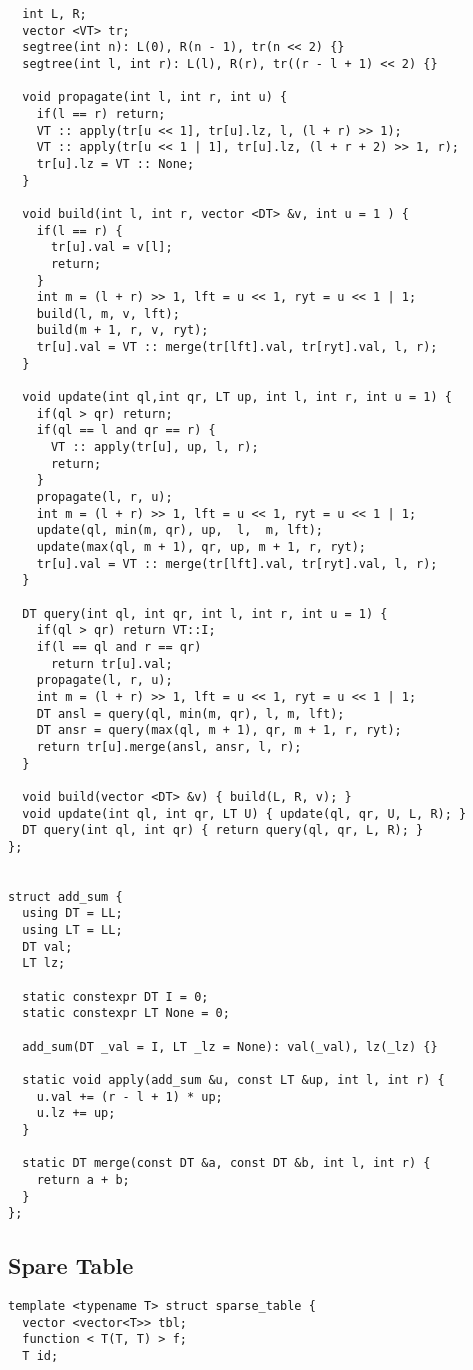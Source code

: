 \documentclass[FSZ,a4paper,onesided]{article}
\begin{document}
\begin{multicols*}{\COLS}
\begin{lstlisting}
  int L, R;
  vector <VT> tr;
  segtree(int n): L(0), R(n - 1), tr(n << 2) {}
  segtree(int l, int r): L(l), R(r), tr((r - l + 1) << 2) {}

  void propagate(int l, int r, int u) {
    if(l == r) return;
    VT :: apply(tr[u << 1], tr[u].lz, l, (l + r) >> 1);
    VT :: apply(tr[u << 1 | 1], tr[u].lz, (l + r + 2) >> 1, r);
    tr[u].lz = VT :: None;
  }

  void build(int l, int r, vector <DT> &v, int u = 1 ) {
    if(l == r) {
      tr[u].val = v[l];
      return;
    }
    int m = (l + r) >> 1, lft = u << 1, ryt = u << 1 | 1;
    build(l, m, v, lft);
    build(m + 1, r, v, ryt);
    tr[u].val = VT :: merge(tr[lft].val, tr[ryt].val, l, r);
  }

  void update(int ql,int qr, LT up, int l, int r, int u = 1) {
    if(ql > qr) return;
    if(ql == l and qr == r) {
      VT :: apply(tr[u], up, l, r);
      return;
    }
    propagate(l, r, u);
    int m = (l + r) >> 1, lft = u << 1, ryt = u << 1 | 1;
    update(ql, min(m, qr), up,  l,  m, lft);
    update(max(ql, m + 1), qr, up, m + 1, r, ryt);
    tr[u].val = VT :: merge(tr[lft].val, tr[ryt].val, l, r);
  }

  DT query(int ql, int qr, int l, int r, int u = 1) {
    if(ql > qr) return VT::I;
    if(l == ql and r == qr)
      return tr[u].val;
    propagate(l, r, u);
    int m = (l + r) >> 1, lft = u << 1, ryt = u << 1 | 1;
    DT ansl = query(ql, min(m, qr), l, m, lft);
    DT ansr = query(max(ql, m + 1), qr, m + 1, r, ryt);
    return tr[u].merge(ansl, ansr, l, r);
  }

  void build(vector <DT> &v) { build(L, R, v); }
  void update(int ql, int qr, LT U) { update(ql, qr, U, L, R); }
  DT query(int ql, int qr) { return query(ql, qr, L, R); }
};


struct add_sum {
  using DT = LL;
  using LT = LL;
  DT val;
  LT lz;

  static constexpr DT I = 0; 
  static constexpr LT None = 0;
  
  add_sum(DT _val = I, LT _lz = None): val(_val), lz(_lz) {}

  static void apply(add_sum &u, const LT &up, int l, int r) {
    u.val += (r - l + 1) * up;
    u.lz += up;
  }

  static DT merge(const DT &a, const DT &b, int l, int r) {
    return a + b;
  }
};
\end{lstlisting}
\subsection{Spare Table}
\begin{lstlisting}
template <typename T> struct sparse_table {
  vector <vector<T>> tbl;
  function < T(T, T) > f;
  T id;


\end{lstlisting}
\end{multicols*}
\end{document}
